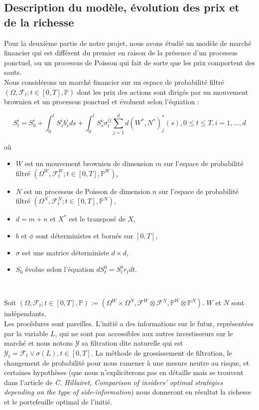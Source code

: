 \documentclass[../finalreport.tex]{subfiles}
\begin{document}
\subsection{Description du modèle, évolution des prix et de la richesse}
Pour la deuxième partie de notre projet, nous avons étudié un modèle de marché financier qui est différent du premier en raison de la présence d'un processus ponctuel, ou un processus de Poisson qui fait de sorte que les prix comportent des sauts.\\

Nous considérons un marché financier sur un espace de probabilité filtré $(\Omega, \mathcal{F}_t; t \in [0, T], \mathbb{P})$ dont les prix des actions sont dirigés par un mouvement brownien et un processus ponctuel et évoluent selon l'équation : 

\begin{equation}
S_t^i = S_0^i + \displaystyle \int_{0}^{t}S_s^i b_s^i ds + \int_{0}^{t}S_s^i \sigma^{ij}_t \sum_{j = 1}^{d} d(W^*, N^*)^{*}_j(s), 0 \leq t \leq T, i = 1, ..., d
\end{equation}

où\\

\begin{itemize} 
\item $W$ est un mouvement brownien de dimension $m$ sur l'espace de probabilité filtré $(\Omega^W, \mathcal{F}^W_t; t \in [0, T], \mathbb{P}^W)$,
\item $N$ est un processus de Poisson de dimension $n$ sur l'espace de probabilité filtré $(\Omega^N, \mathcal{F}^N_t; t \in [0, T], \mathbb{P}^N)$,
\item $d = m+n$ et $X^*$ est le transposé de $X$,
\item $b$ et $\phi$ sont déterministes et bornés sur $[0, T]$,
\item $\sigma$ est une matrice déterministe $d \times d$,
\item $S_0$ évolue selon l'équation $dS^0_t = S^0_t r_t dt$.
\end{itemize}
\

Soit $(\Omega, \mathcal{F}_t; t\in [0, T], \mathbb{P}) := (\Omega^W \times \Omega^N, \mathcal{F}^W \otimes \mathcal{F}^N, \mathbb{P}^W \otimes \mathbb{P}^N)$. $W$ et $N$ sont indépendants. \\

Les procédures sont pareilles. L'initié a des informations sur le futur, représentées par la variable $L$, qui ne sont pas accessibles aux autres investisseurs sur le marché et nous notons $\mathcal{Y}$ sa filtration dite naturelle qui est $\mathcal{Y}_t = \mathcal{F}_t \vee \sigma(L), t \in [0, T]$. La méthode de grossissement de filtration, le changement de probabilité pour nous ramener à une mesure neutre au risque, et certaines hypothèses (que nous n'expliciterons pas en détaille mais se trouvent dans l'article de \textit{C. Hillairet, Comparison of insiders' optimal strategies depending on the type of side-information}) nous donneront en résultat la richesse et le portefeuille optimal de l'initié.\\
\end{document}
